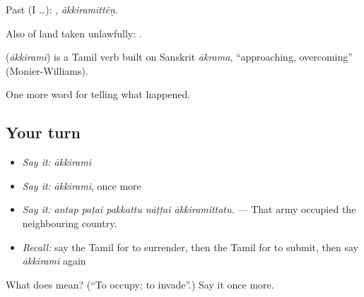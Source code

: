 Past (I …): , \emph{ākkiramittēṉ}.

Also of land taken unlawfully:  .

\begin{cousinweb}
\textbf{} (\emph{ākkirami}) is a Tamil verb built on Sanskrit \emph{ākrama}, \textquotedblleft{}approaching, overcoming\textquotedblright{} (Monier-Williams).
\end{cousinweb}

\begin{grammarlens}[title={What you've built}]
One more word for telling what happened.
\end{grammarlens}

\subsection*{Your turn}
\begin{itemize}
\raggedright
  \item \emph{Say it:} \emph{ākkirami}
  \item \emph{Say it:} \emph{ākkirami}, once more
  \item \emph{Say it:} \emph{antap paṭai pakkattu nāṭṭai ākkiramittatu.} — That army occupied the neighbouring country.
  \item \emph{Recall:} say the Tamil for to surrender, then the Tamil for to submit, then say \emph{ākkirami} again
\end{itemize}

\begin{tcolorbox}[breakable,colback=teal!4,colframe=teal!35!black,title={Before you move on}]
What does  mean? (\textquotedblleft{}To occupy; to invade\textquotedblright{}.) Say it once more.
\end{tcolorbox}
